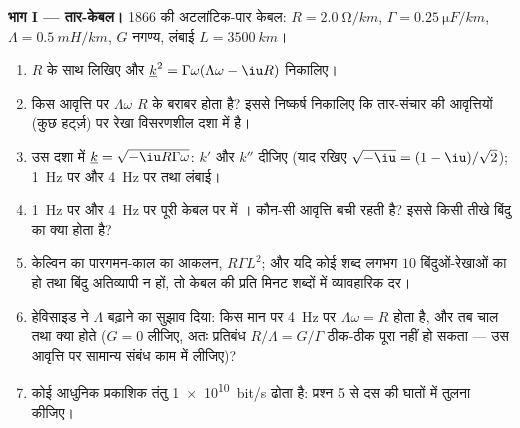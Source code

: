 \begin{problem}[{सप्ताहांत समस्या --- परिक्षेपण काम पर: वह तार-केबल
जिसने बिंदुओं को लीप दिया, वह स्वेल जो तूफ़ान की सूचना देती है, वह
सुनामी जो पूरा महासागर पार कर जाती है, और वह पुंज जो फैलता है}]
\label{pb:b2:dispersion-wave-packets:1}

\medskip
\noindent\textbf{भाग I --- तार-केबल।}
1866 की अटलांटिक-पार केबल: $R = \qty{2.0}{\ohm/km}$, $\Gamma = \qty{0.25}{\micro F/km}$,
$\Lambda = \qty{0.5}{mH/km}$, $G$ नगण्य, लंबाई $L = \qty{3500}{km}$।
\begin{enumerate}
  \item $R$ के साथ  लिखिए और
         $\underline k^2 = \Gamma\omega(\Lambda\omega - \iu R)$ निकालिए।
  \item किस आवृत्ति पर $\Lambda\omega$ $R$ के बराबर होता है? इससे निष्कर्ष निकालिए कि
        तार-संचार की आवृत्तियों (कुछ हर्ट्ज़) पर रेखा
        विसरणशील दशा में है।
  \item उस दशा में $\underline k = \sqrt{-\iu R\Gamma\omega}$: $k'$ और $k''$ दीजिए
        (याद रखिए $\sqrt{-\iu} = (1 - \iu)/\sqrt2$); \qty{1}{Hz} पर और \qty{4}{Hz} पर
         तथा  लंबाई।
  \item \qty{1}{Hz} पर और \qty{4}{Hz} पर पूरी केबल पर  में ।
        कौन-सी आवृत्ति बची रहती है? इससे किसी तीखे बिंदु का
        क्या होता है?
  \item केल्विन का पारगमन-काल का आकलन, $R\Gamma L^2$; और यदि कोई शब्द लगभग
        $10$ बिंदुओं-रेखाओं का हो तथा बिंदु अतिव्यापी न हों, तो
        केबल की प्रति मिनट शब्दों में व्यावहारिक दर।
  \item हेविसाइड ने $\Lambda$ बढ़ाने का सुझाव दिया: किस मान पर \qty{4}{Hz} पर
        $\Lambda\omega = R$ होता है, और तब चाल तथा  क्या होते
        ($G = 0$ लीजिए, अतः प्रतिबंध $R/\Lambda = G/\Gamma$ ठीक-ठीक पूरा नहीं
        हो सकता --- उस आवृत्ति पर सामान्य संबंध काम में लीजिए)?
  \item कोई आधुनिक प्रकाशिक तंतु \qty{1e10}{bit/s} ढोता है:
        प्रश्न 5 से दस की घातों में तुलना कीजिए।
\end{enumerate}


\end{problem}

